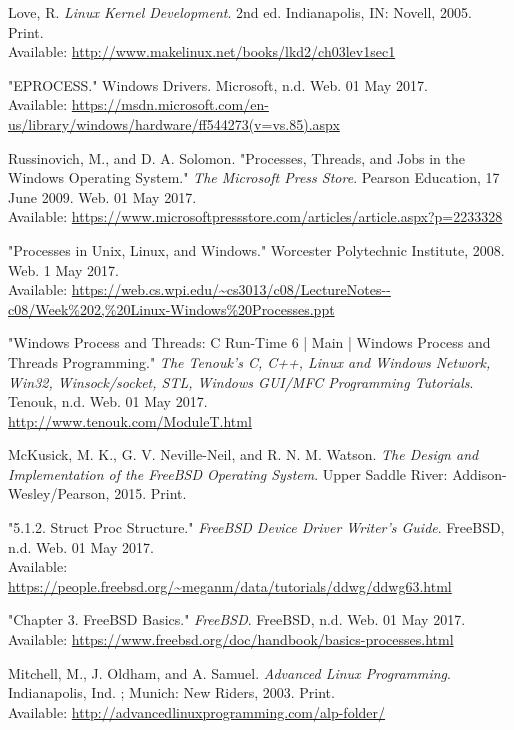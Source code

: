 \documentclass[10pt,draftclsnofoot,onecolumn,journal,compsoc]{IEEEtran}
\begin{document}
\newpage

\begin{thebibliography}{18}

Love, R. \textit{Linux Kernel Development}. 2nd ed. Indianapolis, IN: Novell, 2005. Print. \\
Available: \url{http://www.makelinux.net/books/lkd2/ch03lev1sec1}

"EPROCESS." Windows Drivers. Microsoft, n.d. Web. 01 May 2017. \\
Available: \url{https://msdn.microsoft.com/en-us/library/windows/hardware/ff544273(v=vs.85).aspx}

Russinovich, M., and D. A. Solomon. "Processes, Threads, and Jobs in the Windows Operating System." \textit{The Microsoft Press Store}. Pearson Education, 17 June 2009. Web. 01 May 2017. \\
Available: \url{https://www.microsoftpressstore.com/articles/article.aspx?p=2233328}

"Processes in Unix, Linux, and Windows." Worcester Polytechnic Institute, 2008. Web. 1 May 2017. \\
Available: \url{https://web.cs.wpi.edu/~cs3013/c08/LectureNotes--c08/Week\%202,\%20Linux-Windows\%20Processes.ppt}

"Windows Process and Threads: C Run-Time 6 | Main | Windows Process and Threads Programming." \textit{The Tenouk's C, C++, Linux and Windows Network, Win32, Winsock/socket, STL, Windows GUI/MFC Programming Tutorials}. Tenouk, n.d. Web. 01 May 2017. \\
\url{http://www.tenouk.com/ModuleT.html}

McKusick, M. K., G. V. Neville-Neil, and R. N. M. Watson. \textit{The Design and Implementation of the FreeBSD Operating System}. Upper Saddle River: Addison-Wesley/Pearson, 2015. Print.

"5.1.2. Struct Proc Structure." \textit{FreeBSD Device Driver Writer's Guide}. FreeBSD, n.d. Web. 01 May 2017. \\
Available: \url{https://people.freebsd.org/~meganm/data/tutorials/ddwg/ddwg63.html}

"Chapter 3. FreeBSD Basics." \textit{FreeBSD}. FreeBSD, n.d. Web. 01 May 2017. \\
Available: \url{https://www.freebsd.org/doc/handbook/basics-processes.html}

Mitchell, M., J. Oldham, and A. Samuel. \textit{Advanced Linux Programming}. Indianapolis, Ind. ; Munich: New Riders, 2003. Print. \\
Available: \url{http://advancedlinuxprogramming.com/alp-folder/}


\end{thebibliography}
\end{document}
